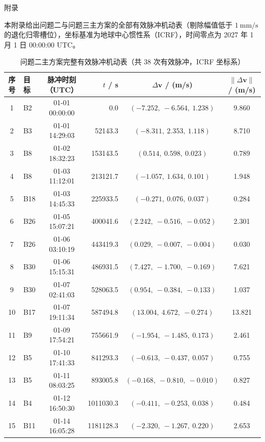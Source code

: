 \clearpage
\begin{center}{\heiti{}附\quad 录}\end{center}
\vspace{4pt}
本附录给出问题二与问题三主方案的全部有效脉冲机动表（剔除幅值低于 $1~\mathrm{mm/s}$ 的退化归零槽位），坐标基准为地球中心惯性系（ICRF），时间零点为 2027 年 1 月 1 日 00:00:00 UTC。

\begin{table}[!htb]
  \centering
  \caption{问题二主方案完整有效脉冲机动表（共 38 次有效脉冲，ICRF 坐标系）}
  \label{tab:app_q2burns}
  \setlength{\tabcolsep}{3.5pt}\renewcommand{\arraystretch}{0.90}
  \begin{tabular}{clcrcc}
    \toprule
    序号 & 目标 & 脉冲时刻（UTC） & $t$ / s & $\Delta\bm v$ / (m/s) & $\|\Delta\bm v\|$ / (m/s) \\
    \midrule
    1 & B2 & 01-01 00:00:00 & 0.0 & $(-7.252,\ -6.564,\ 1.238)$ & 9.860 \\
    2 & B3 & 01-01 14:29:03 & 52143.3 & $(-8.311,\ 2.353,\ 1.118)$ & 8.710 \\
    3 & B8 & 01-02 18:32:23 & 153143.5 & $(0.514,\ 0.598,\ 0.023)$ & 0.789 \\
    4 & B8 & 01-03 11:12:01 & 213121.7 & $(-1.057,\ 1.634,\ 0.101)$ & 1.948 \\
    5 & B18 & 01-03 14:45:33 & 225933.5 & $(-0.271,\ 0.076,\ 0.037)$ & 0.284 \\
    6 & B26 & 01-05 15:07:21 & 400041.6 & $(2.242,\ -0.516,\ -0.052)$ & 2.301 \\
    7 & B26 & 01-06 03:10:19 & 443419.3 & $(0.029,\ -0.007,\ -0.004)$ & 0.030 \\
    8 & B30 & 01-06 15:15:31 & 486931.5 & $(7.427,\ -1.700,\ -0.169)$ & 7.621 \\
    9 & B30 & 01-07 02:41:03 & 528063.5 & $(0.954,\ -0.384,\ -0.133)$ & 1.037 \\
    10 & B17 & 01-07 19:11:34 & 587494.8 & $(13.004,\ 4.672,\ -0.274)$ & 13.821 \\
    11 & B9 & 01-09 17:54:21 & 755661.9 & $(-1.954,\ -1.485,\ 0.173)$ & 2.461 \\
    12 & B5 & 01-10 17:41:33 & 841293.3 & $(-0.613,\ -0.437,\ 0.057)$ & 0.755 \\
    13 & B5 & 01-11 08:03:25 & 893005.8 & $(-0.168,\ -0.810,\ -0.010)$ & 0.827 \\
    14 & B4 & 01-12 16:50:30 & 1011030.3 & $(-0.411,\ -0.253,\ 0.038)$ & 0.484 \\
    15 & B11 & 01-14 16:05:28 & 1181128.3 & $(-2.320,\ -1.267,\ 0.220)$ & 2.653 \\

\end{tabular}
\end{table}
